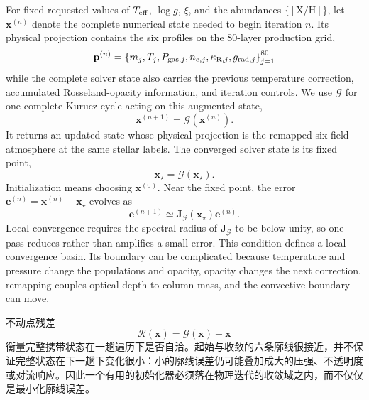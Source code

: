 \begin{EN}
For fixed requested values of $T_{\rm eff}$, $\log g$, $\xi$, and the
abundances $\{[\mathrm{X}/\mathrm{H}]\}$, let $\mathbf{x}^{(n)}$ denote the
complete numerical state needed to begin iteration $n$. Its physical projection
contains the six profiles on the 80-layer production grid,
\begin{equation}
\mathbf{p}^{(n)}
=\left\{m_j,T_j,P_{{\rm gas},j},n_{e,j},
\kappa_{{\rm R},j},g_{{\rm rad},j}\right\}_{j=1}^{80}
\end{equation}
\noindent while the complete solver state also carries the previous temperature
correction, accumulated Rosseland-opacity information, and iteration controls. We use
$\mathcal{G}$ for one complete Kurucz cycle acting on this augmented state,
\begin{equation}
\mathbf{x}^{(n+1)}=\mathcal{G}\left(\mathbf{x}^{(n)}\right).
\end{equation}
\noindent It returns an updated state whose physical projection is the remapped
six-field atmosphere at the same stellar labels. The converged solver state is
its fixed point,
\begin{equation}
\mathbf{x}_\star=\mathcal{G}\left(\mathbf{x}_\star\right).
\end{equation}
\noindent Initialization means choosing $\mathbf{x}^{(0)}$. Near the fixed point, the error
$\mathbf{e}^{(n)}=\mathbf{x}^{(n)}-\mathbf{x}_\star$ evolves as
\begin{equation}
\mathbf{e}^{(n+1)}
\simeq
\mathbf{J}_{\mathcal{G}}(\mathbf{x}_\star)\mathbf{e}^{(n)} .
\end{equation}
\noindent Local convergence requires the spectral radius of
$\mathbf{J}_{\mathcal{G}}$ to be below unity, so one pass reduces rather than
amplifies a small error. This condition defines a local convergence basin.
Its boundary can be complicated because temperature and pressure change the
populations and opacity, opacity changes the next correction, remapping couples
optical depth to column mass, and the convective boundary can move.
\end{EN}

不动点残差
\begin{equation}
\mathcal{R}(\mathbf{x})
=\mathcal{G}(\mathbf{x})-\mathbf{x}
\end{equation}
\noindent 衡量完整携带状态在一趟遍历下是否自洽。起始与收敛的六条廓线很接近，并不保证完整状态在下一趟下变化很小：小的廓线误差仍可能叠加成大的压强、不透明度或对流响应。因此一个有用的初始化器必须落在物理迭代的收敛域之内，而不仅仅是最小化廓线误差。

